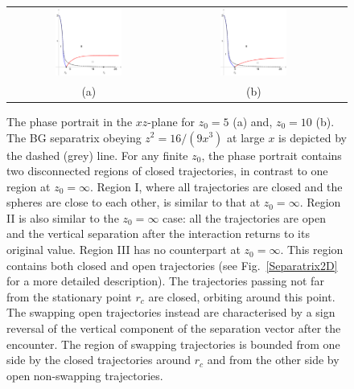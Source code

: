 \begin{figure}
\begin{tabular}{ccc}
\includegraphics[width=0.43\textwidth]{Fig4a.pdf} \hspace{1cm} &
\includegraphics[width=0.43\textwidth]{Fig4b.pdf}
\\
(a) & (b)
\end{tabular}
\caption{The phase portrait in the $xz$-plane for $z_0=5$ (a) and,
$z_0=10$ (b). The BG separatrix obeying $z^2=16/(9x^3)$ at large $x$ is depicted by the dashed (grey) line. For any finite $z_0$, the phase portrait contains two disconnected regions of closed trajectories, in contrast to one region at $z_0=\infty$. Region I, where all trajectories are closed and the spheres are close to each other, is similar to that at $z_0=\infty$. Region II is also similar to the $z_0=\infty$ case: all the trajectories are open and the vertical separation after the interaction returns to its original value.
Region III has no counterpart at $z_0=\infty$. This region contains both closed and open trajectories (see Fig.~\ref{Separatrix2D} for a more detailed description). The trajectories passing not far from the stationary point $r_c$ are closed, orbiting around this point. The swapping open trajectories instead are characterised by a sign reversal of the vertical component of the separation vector after the encounter. The region of swapping trajectories is bounded from one
side by the closed trajectories around $r_c$ and from the other side by open non-swapping trajectories.}
\label{fig:Fig4a}
\end{figure}

